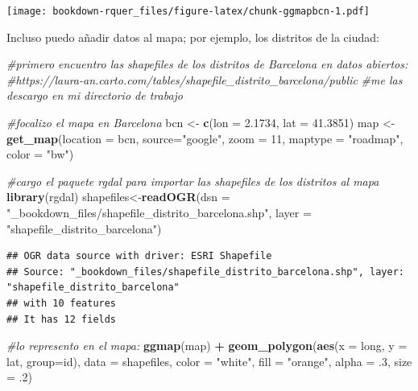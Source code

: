 \documentclass[]{book}
\newenvironment{Shaded}{\begin{snugshade}}{\end{snugshade}}
\newcommand{\CommentTok}[1]{\textcolor[rgb]{0.56,0.35,0.01}{\textit{#1}}}
\newcommand{\DataTypeTok}[1]{\textcolor[rgb]{0.13,0.29,0.53}{#1}}
\newcommand{\DecValTok}[1]{\textcolor[rgb]{0.00,0.00,0.81}{#1}}
\newcommand{\FloatTok}[1]{\textcolor[rgb]{0.00,0.00,0.81}{#1}}
\newcommand{\KeywordTok}[1]{\textcolor[rgb]{0.13,0.29,0.53}{\textbf{#1}}}
\newcommand{\NormalTok}[1]{#1}
\newcommand{\OperatorTok}[1]{\textcolor[rgb]{0.81,0.36,0.00}{\textbf{#1}}}
\newcommand{\StringTok}[1]{\textcolor[rgb]{0.31,0.60,0.02}{#1}}
\theoremstyle{definition}
\theoremstyle{definition}
\theoremstyle{definition}
\theoremstyle{remark}
\begin{document}
\texttt{[image: bookdown-rquer\_files/figure-latex/chunk-ggmapbcn-1.pdf]}

Incluso puedo añadir datos al mapa; por ejemplo, los distritos de la
ciudad:

\begin{Shaded}
\begin{Highlighting}[]
\CommentTok{#primero encuentro las shapefiles de los distritos de Barcelona en datos abiertos:}
\CommentTok{#https://laura-an.carto.com/tables/shapefile_distrito_barcelona/public}
\CommentTok{#me las descargo en mi directorio de trabajo}

\CommentTok{#focalizo el mapa en Barcelona}
\NormalTok{bcn <-}\StringTok{ }\KeywordTok{c}\NormalTok{(}\DataTypeTok{lon =} \FloatTok{2.1734}\NormalTok{, }\DataTypeTok{lat =} \FloatTok{41.3851}\NormalTok{)}
\NormalTok{map <-}\StringTok{ }\KeywordTok{get_map}\NormalTok{(}\DataTypeTok{location =}\NormalTok{ bcn, }\DataTypeTok{source=}\StringTok{"google"}\NormalTok{, }\DataTypeTok{zoom =} \DecValTok{11}\NormalTok{, }\DataTypeTok{maptype =} \StringTok{"roadmap"}\NormalTok{, }\DataTypeTok{color =} \StringTok{"bw"}\NormalTok{)}

\CommentTok{#cargo el paquete rgdal para importar las shapefiles de los distritos al mapa}
\KeywordTok{library}\NormalTok{(rgdal)}
\NormalTok{shapefiles<-}\KeywordTok{readOGR}\NormalTok{(}\DataTypeTok{dsn =} \StringTok{"_bookdown_files/shapefile_distrito_barcelona.shp"}\NormalTok{,}
                    \DataTypeTok{layer =} \StringTok{"shapefile_distrito_barcelona"}\NormalTok{) }
\end{Highlighting}
\end{Shaded}

\begin{verbatim}
## OGR data source with driver: ESRI Shapefile 
## Source: "_bookdown_files/shapefile_distrito_barcelona.shp", layer: "shapefile_distrito_barcelona"
## with 10 features
## It has 12 fields
\end{verbatim}

\begin{Shaded}
\begin{Highlighting}[]
\CommentTok{#lo represento en el mapa:}
\KeywordTok{ggmap}\NormalTok{(map) }\OperatorTok{+}\StringTok{ }\KeywordTok{geom_polygon}\NormalTok{(}\KeywordTok{aes}\NormalTok{(}\DataTypeTok{x =}\NormalTok{ long, }\DataTypeTok{y =}\NormalTok{ lat, }\DataTypeTok{group=}\NormalTok{id), }
\DataTypeTok{data =}\NormalTok{ shapefiles, }\DataTypeTok{color =} \StringTok{"white"}\NormalTok{, }\DataTypeTok{fill =} \StringTok{"orange"}\NormalTok{, }
\DataTypeTok{alpha =} \FloatTok{.3}\NormalTok{, }\DataTypeTok{size =} \FloatTok{.2}\NormalTok{)}
\end{Highlighting}
\end{Shaded}
\end{document}

